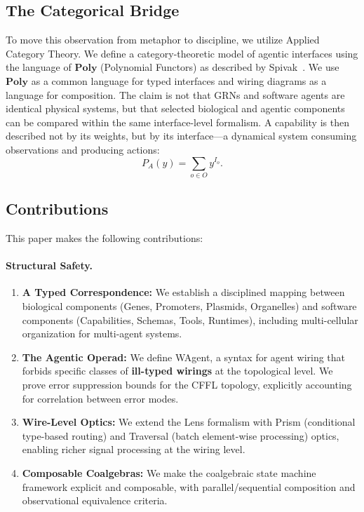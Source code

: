 \subsection{The Categorical Bridge}

To move this observation from metaphor to discipline, we utilize Applied Category Theory. We define a
category-theoretic model of agentic interfaces using the language of $\mathbf{Poly}$ (Polynomial Functors)
as described by Spivak~\cite{spivak2021learners}.
We use $\mathbf{Poly}$ as a common language for typed interfaces and wiring diagrams as a language for
composition. The claim is not that GRNs and software agents are identical physical systems, but that
selected biological and agentic components can be compared within the same interface-level formalism.
A capability is then described not by its weights, but by its interface---a dynamical system consuming
observations and producing actions:
\begin{equation}
P_A(y) = \sum_{o\in O} y^{I_o}.
\label{eq:poly-functor-agent}
\end{equation}

\subsection{Contributions}

This paper makes the following contributions:

\paragraph{Structural Safety.}
\begin{enumerate}[leftmargin=*]
\item \textbf{A Typed Correspondence:} We establish a disciplined mapping between biological components
(Genes, Promoters, Plasmids, Organelles) and software components (Capabilities, Schemas, Tools, Runtimes),
including multi-cellular organization for multi-agent systems.
\item \textbf{The Agentic Operad:} We define WAgent, a syntax for agent wiring that forbids specific classes
of \textbf{ill-typed wirings} at the topological level. We prove error suppression bounds for the CFFL
topology, explicitly accounting for correlation between error modes.
\item \textbf{Wire-Level Optics:} We extend the Lens formalism with Prism (conditional type-based routing)
and Traversal (batch element-wise processing) optics, enabling richer signal processing at the wiring level.
\item \textbf{Composable Coalgebras:} We make the coalgebraic state machine framework explicit and
composable, with parallel/sequential composition and observational equivalence criteria.
\end{enumerate}

